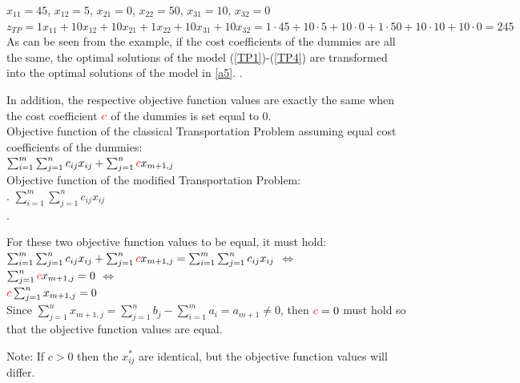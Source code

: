 \begin{enumerate}
\begin{solution}
		$x_{11}=45$, $x_{12}=5$, $x_{21}=0$, $x_{22}=50$, $x_{31}=10$, $x_{32}=0$\\
		$z_{TP}= 1x_{11}+10x_{12}+10x_{21}+1x_{22}+10x_{31}+10x_{32}=1\cdot45+10\cdot5+10\cdot0+1\cdot50+10\cdot10+10\cdot0=245$\\
		
		As can be seen from the example, if the cost coefficients of the dummies are all the same, the optimal solutions of the model (\ref{TP1})-(\ref{TP4}) are transformed into the optimal solutions of the model in \ref{a5}. .
		
		In addition, the respective objective function values are exactly the same when the cost coefficient ${\color{red}c}$ of the dummies is set equal to 0.\\
		
		Objective function of the classical Transportation Problem assuming equal cost coefficients of the dummies:\\
		$\sum_{i=1}^m\sum_{j=1}^n c_{ij} x_{ij}+\sum_{j=1}^n {\color{red}c}x_{m+1,j}$\\
		Objective function of the modified Transportation Problem:\\.
		$\sum_{i=1}^m\sum_{j=1}^n c_{ij} x_{ij}$\\.
		
		For these two objective function values to be equal, it must hold:\\
 		
 		 $\sum_{i=1}^m\sum_{j=1}^n c_{ij} x_{ij}+\sum_{j=1}^n {\color{red}c}x_{m+1,j}=\sum_{i=1}^m\sum_{j=1}^n c_{ij} x_{ij}$ $\Leftrightarrow$\\
 		 $\sum_{j=1}^n {\color{red}c}x_{m+1,j}=0$ $\Leftrightarrow$\\
 		 ${\color{red}c} \sum_{j=1}^n x_{m+1,j}=0$ \\
 		
 		 Since $\sum_{j=1}^n x_{m+1,j}=\sum_{j=1}^n b_j-\sum_{i=1}^m a_i = a_{m+1}\neq 0$, then ${\color{red}c}=0$ must hold so that the objective function values are equal.
 		
 		 Note:
 		 If $c>0$ then the $x_{ij}^*$ are identical, but the objective function values will differ.
	\end{solution}	
\end{enumerate}